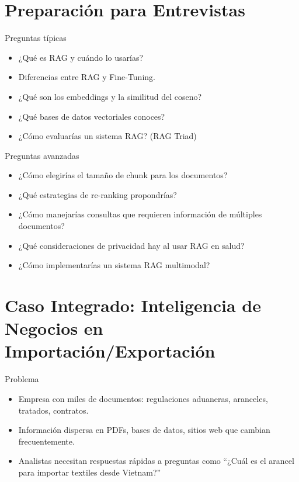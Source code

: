 \documentclass[aspectratio=169, 10pt, xcolor=table]{beamer}
\begin{document}
\section{Preparaci\'on para Entrevistas}

\begin{frame}{Preguntas t\'ipicas}
    \begin{itemize}
        \item ¿Qu\'e es RAG y cu\'ando lo usar\'ias?
        \item Diferencias entre RAG y Fine-Tuning.
        \item ¿Qu\'e son los embeddings y la similitud del coseno?
        \item ¿Qu\'e bases de datos vectoriales conoces?
        \item ¿C\'omo evaluar\'ias un sistema RAG? (RAG Triad)
    \end{itemize}
\end{frame}

\begin{frame}{Preguntas avanzadas}
    \begin{itemize}
        \item ¿C\'omo elegir\'ias el tama\~no de chunk para los documentos?
        \item ¿Qu\'e estrategias de re-ranking propondr\'ias?
        \item ¿C\'omo manejar\'ias consultas que requieren informaci\'on de m\'ultiples documentos?
        \item ¿Qu\'e consideraciones de privacidad hay al usar RAG en salud?
        \item ¿C\'omo implementar\'ias un sistema RAG multimodal?
    \end{itemize}
\end{frame}

\section{Caso Integrado: Inteligencia de Negocios en Importaci\'on/Exportaci\'on}

\begin{frame}{Problema}
    \begin{itemize}
        \item Empresa con miles de documentos: regulaciones aduaneras, aranceles, tratados, contratos.
        \item Informaci\'on dispersa en PDFs, bases de datos, sitios web que cambian frecuentemente.
        \item Analistas necesitan respuestas r\'apidas a preguntas como ``¿Cu\'al es el arancel para importar textiles desde Vietnam?''
    \end{itemize}
\end{frame}
\end{document}

